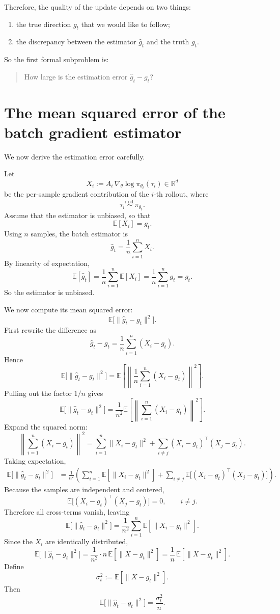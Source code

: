 \documentclass[11pt]{article}
\begin{document}
Therefore, the quality of the update depends on two things:
\begin{enumerate}
    \item the true direction $g_t$ that we would like to follow;
    \item the discrepancy between the estimator $\hat g_t$ and the truth $g_t$.
\end{enumerate}

So the first formal subproblem is:
\begin{quote}
How large is the estimation error $\hat g_t - g_t$?
\end{quote}

\section{The mean squared error of the batch gradient estimator}

We now derive the estimation error carefully.

Let
\[
X_i := A_i\,\nabla_\theta \log \pi_{\theta_t}(\tau_i) \in \mathbb{R}^d
\]
be the per-sample gradient contribution of the $i$-th rollout, where
\[
\tau_i \overset{\text{i.i.d.}}{\sim} \pi_{\theta_t}.
\]
Assume that the estimator is unbiased, so that
\[
\mathbb{E}[X_i] = g_t.
\]
Using $n$ samples, the batch estimator is
\[
\hat g_t = \frac{1}{n}\sum_{i=1}^n X_i.
\]
By linearity of expectation,
\[
\mathbb{E}[\hat g_t]
=
\frac{1}{n}\sum_{i=1}^n \mathbb{E}[X_i]
=
\frac{1}{n}\sum_{i=1}^n g_t
=
g_t.
\]
So the estimator is unbiased.

We now compute its mean squared error:
\[
\mathbb{E}\bigl[\|\hat g_t - g_t\|^2\bigr].
\]
First rewrite the difference as
\[
\hat g_t - g_t
=
\frac{1}{n}\sum_{i=1}^n (X_i - g_t).
\]
Hence
\[
\mathbb{E}\bigl[\|\hat g_t - g_t\|^2\bigr]
=
\mathbb{E}\left[\left\|\frac{1}{n}\sum_{i=1}^n (X_i-g_t)\right\|^2\right].
\]
Pulling out the factor $1/n$ gives
\[
\mathbb{E}\bigl[\|\hat g_t - g_t\|^2\bigr]
=
\frac{1}{n^2}
\mathbb{E}\left[\left\|\sum_{i=1}^n (X_i-g_t)\right\|^2\right].
\]
Expand the squared norm:
\[
\left\|\sum_{i=1}^n (X_i-g_t)\right\|^2
=
\sum_{i=1}^n \|X_i-g_t\|^2
+
\sum_{i\neq j}(X_i-g_t)^\top (X_j-g_t).
\]
Taking expectation,
\begin{align*}
\mathbb{E}\bigl[\|\hat g_t - g_t\|^2\bigr]
&=
\frac{1}{n^2}
\left(
\sum_{i=1}^n \mathbb{E}[\|X_i-g_t\|^2]
+
\sum_{i\neq j}\mathbb{E}\bigl[(X_i-g_t)^\top(X_j-g_t)\bigr]
\right).
\end{align*}
Because the samples are independent and centered,
\[
\mathbb{E}\bigl[(X_i-g_t)^\top(X_j-g_t)\bigr]=0,
\qquad i\neq j.
\]
Therefore all cross-terms vanish, leaving
\[
\mathbb{E}\bigl[\|\hat g_t - g_t\|^2\bigr]
=
\frac{1}{n^2}
\sum_{i=1}^n \mathbb{E}[\|X_i-g_t\|^2].
\]
Since the $X_i$ are identically distributed,
\[
\mathbb{E}\bigl[\|\hat g_t - g_t\|^2\bigr]
=
\frac{1}{n^2}\cdot n \, \mathbb{E}[\|X-g_t\|^2]
=
\frac{1}{n}\,\mathbb{E}[\|X-g_t\|^2].
\]
Define
\[
\sigma_t^2 := \mathbb{E}[\|X-g_t\|^2].
\]
Then
\begin{equation}
\mathbb{E}\bigl[\|\hat g_t - g_t\|^2\bigr]
=
\frac{\sigma_t^2}{n}.
\label{eq:mse-nominal}
\end{equation}
\end{document}
